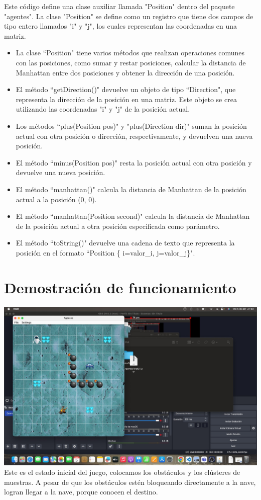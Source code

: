 \documentclass{article}
\begin{document}
Este código define una clase auxiliar llamada "Position" dentro del paquete "agentes". La clase "Position" se define como un registro que tiene dos campos de tipo entero llamados "i" y "j", los cuales representan las coordenadas en una matriz.
\begin{itemize}
	\item La clase ``Position" tiene varios métodos que realizan operaciones comunes con las posiciones, como sumar y restar posiciones, calcular la distancia de Manhattan entre dos posiciones y obtener la dirección de una posición.

	\item El método ``getDirection()" devuelve un objeto de tipo ``Direction", que representa la dirección de la posición en una matriz. Este objeto se crea utilizando las coordenadas "i" y "j" de la posición actual.
	
	\item Los métodos ``plus(Position pos)" y "plus(Direction dir)" suman la posición actual con otra posición o dirección, respectivamente, y devuelven una nueva posición.
	
	\item El método ``minus(Position pos)" resta la posición actual con otra posición y devuelve una nueva posición.
	
	\item El método ``manhattan()" calcula la distancia de Manhattan de la posición actual a la posición (0, 0).
	
	\item El método ``manhattan(Position second)" calcula la distancia de Manhattan de la posición actual a otra posición especificada como parámetro.
	
	\item El método ``toString()" devuelve una cadena de texto que representa la posición en el formato ``Position \{ i=valor\_i, j=valor\_j\}".
\end{itemize}
\section{Demostración de funcionamiento}
\includegraphics[scale=0.20]{demo.jpeg}\\
Este es el estado inicial del juego, colocamos los obstáculos y los clústeres de muestras.
A pesar de que los obstáculos estén bloqueando directamente a la nave, logran llegar a la nave, porque conocen el destino.
\end{document}
